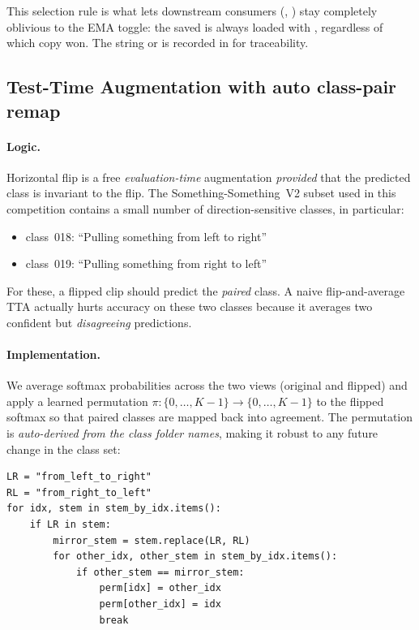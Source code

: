 This selection rule is what lets downstream consumers
(, ) stay completely oblivious to the
EMA toggle: the saved  is always loaded with
, regardless of which
copy won. The string  or  is recorded in
 for traceability.

\subsection{Test-Time Augmentation with auto class-pair remap}
\label{sec:phase2:tta}

\paragraph{Logic.} Horizontal flip is a free \emph{evaluation-time}
augmentation \emph{provided} that the predicted class is invariant to
the flip. The Something-Something~V2 subset used in this competition
contains a small number of direction-sensitive classes, in particular:
\begin{itemize}[leftmargin=2em]
\item class~018: ``Pulling something from left to right''
\item class~019: ``Pulling something from right to left''
\end{itemize}
For these, a flipped clip should predict the \emph{paired} class. A
naive flip-and-average TTA actually hurts accuracy on these two classes
because it averages two confident but \emph{disagreeing} predictions.

\paragraph{Implementation.} We average softmax probabilities across the
two views (original and flipped) and apply a learned permutation
\(\pi: \{0,\ldots,K-1\}\to\{0,\ldots,K-1\}\) to the flipped softmax so
that paired classes are mapped back into agreement. The permutation is
\emph{auto-derived from the class folder names}, making it robust to any
future change in the class set:

\begin{lstlisting}[style=py]
LR = "from_left_to_right"
RL = "from_right_to_left"
for idx, stem in stem_by_idx.items():
    if LR in stem:
        mirror_stem = stem.replace(LR, RL)
        for other_idx, other_stem in stem_by_idx.items():
            if other_stem == mirror_stem:
                perm[idx] = other_idx
                perm[other_idx] = idx
                break
\end{lstlisting}

